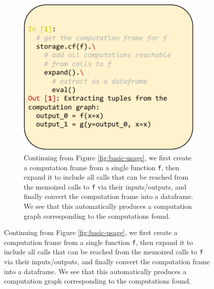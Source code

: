 \begin{figure}[htbp]
    \centering
    \begin{minipage}[b]{0.48\textwidth}
        \begin{subfigure}[b]{\textwidth}
            \centering
            \includegraphics[width=\textwidth]{img/fig4.pdf}
            \caption{Continuing from Figure \ref{fig:basic-usage}, we first
            create a computation frame from a single function \texttt{f}, then
            expand it to include all calls that can be reached from the memoized
            calls to \texttt{f} via their inputs/outputs, and finally convert
            the computation frame into a dataframe. We see that this
            automatically produces a computation graph corresponding to the
            computations found.}
            \label{fig:figure1}
        \end{subfigure}

        \vspace{1em}


\end{minipage}
\end{figure}
